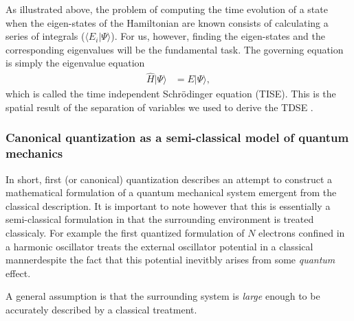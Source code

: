 \documentclass[../../master.tex]{subfiles}
\begin{document}
As illustrated above, the problem of computing the time evolution of a state when the eigen-states of the Hamiltonian are known consists of calculating a series of integrals ($\langle E_i|\Psi\rangle$). For us, however, finding the eigen-states and the corresponding eigenvalues will be the fundamental task. The governing equation is simply the eigenvalue equation 
\begin{align}
\hat H |\Psi\rangle &= E |\Psi\rangle, \label{eq:TISE}
\end{align}
which is called the time independent Schrödinger equation (TISE). This is the spatial result of the separation of variables we used to derive the TDSE \cite{griffiths}. 

\subsubsection{Canonical quantization as a semi-classical model of quantum mechanics}
In short, first (or canonical) quantization describes an attempt to construct a mathematical formulation of a quantum mechanical system emergent from the classical description. It is important to note however that this is essentially a semi-classical formulation in that the surrounding environment is treated classicaly. For example the first quantized formulation of $N$ electrons confined in a harmonic oscillator treats the external oscillator potential in a classical manner\textemdash despite the fact that this potential inevitbly arises from some \emph{quantum} effect. 

A general assumption is that the surrounding system is \emph{large} enough to be accurately described by a classical treatment. 


\end{document}
